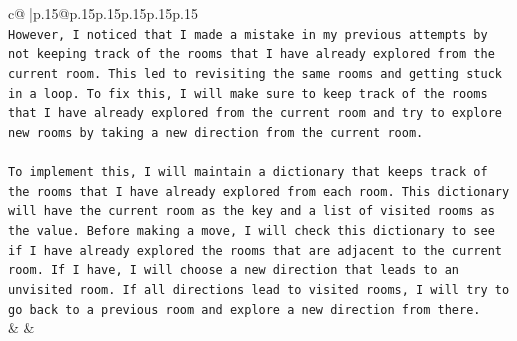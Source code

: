 \documentclass{article}
\begin{document}
{\begin{supertabular}{c@{$\;$}|p{.15\linewidth}@{}p{.15\linewidth}p{.15\linewidth}p{.15\linewidth}p{.15\linewidth}p{.15\linewidth}}
{{{\\ 
\texttt{However, I noticed that I made a mistake in my previous attempts by not keeping track of the rooms that I have already explored from the current room. This led to revisiting the same rooms and getting stuck in a loop. To fix this, I will make sure to keep track of the rooms that I have already explored from the current room and try to explore new rooms by taking a new direction from the current room.} \\
\\ 
\texttt{To implement this, I will maintain a dictionary that keeps track of the rooms that I have already explored from each room. This dictionary will have the current room as the key and a list of visited rooms as the value. Before making a move, I will check this dictionary to see if I have already explored the rooms that are adjacent to the current room. If I have, I will choose a new direction that leads to an unvisited room. If all directions lead to visited rooms, I will try to go back to a previous room and explore a new direction from there.} \\
            }
        }
    }
    & & \\ \\

\end{supertabular}
}
\end{document}
